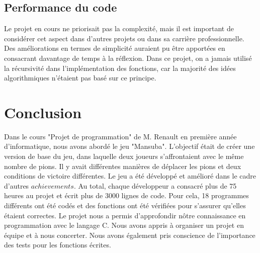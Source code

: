 \documentclass[11pt]{article}
\begin{document}
    \subsection{Performance du code}
        Le projet en cours ne priorisait pas la complexité, mais il est important de considérer cet aspect dans d'autres projets ou dans sa carrière professionnelle. Des améliorations en termes de simplicité auraient pu être apportées en consacrant davantage de temps à la réflexion. Dans ce projet, on a jamais utilisé la récursivité dans l'implémentation des fonctions, car la majorité des idées algorithmiques n'étaient pas basé sur ce principe.
        
    \section{Conclusion}
    Dans le cours "Projet de programmation" de M. Renault en première année d'informatique, nous avons abordé le jeu "Mansuba". L'objectif était de créer une version de base du jeu, dans laquelle deux joueurs s'affrontaient avec le même nombre de pions. Il y avait différentes manières de déplacer les pions et deux conditions de victoire différentes. Le jeu a été développé et amélioré dans le cadre d'autres $achievements$. Au total, chaque développeur a consacré plus de 75 heures au projet et écrit plus de 3000 lignes de code. Pour cela, 18 programmes différents ont été codés et des fonctions ont été vérifiées pour s'assurer qu'elles étaient correctes.
    Le projet nous a permis d'approfondir nôtre connaissance en programmation avec le langage C. Nous avons appris à organiser un projet en équipe et à nous concerter. Nous avons également pris conscience de l'importance des tests pour les fonctions écrites. 
    
    
    










    
\end{document}
